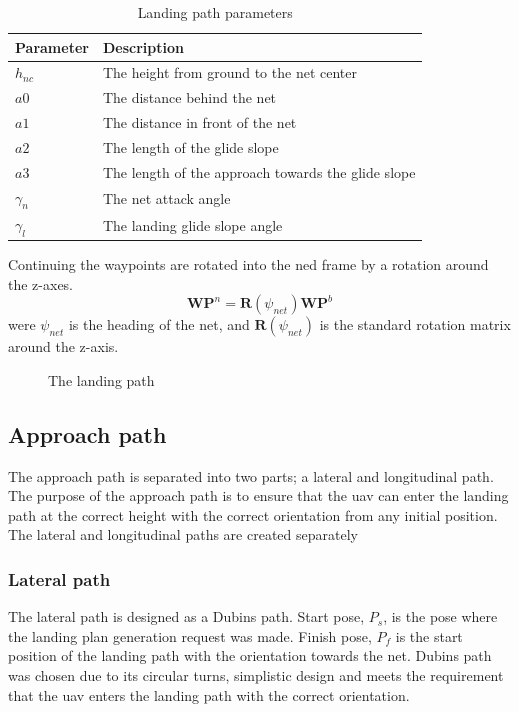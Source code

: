 \begin{table}[H]
\begin{center}
    \begin{tabular}{ | l | l |}
    \hline
    \textbf{Parameter} & \textbf{Description} \\ \hline
    $h_{nc}$ & The height from ground to the net center \\ \hline
    $a0$ & The distance behind the net \\ \hline
    $a1$ & The distance in front of the net \\ \hline
    $a2$ & The length of the glide slope \\ \hline
    $a3$ & The length of the approach towards the glide slope \\ \hline
    $\gamma_n$ & The net attack angle \\ \hline
    $\gamma_l$ & The landing glide slope angle \\ \hline
    \end{tabular}
\end{center}
\caption{Landing path parameters }
\label{Tb:Approach Parameters}
\end{table}
Continuing the waypoints are rotated into the \gls{ned} frame by a rotation around the z-axes.
\begin{equation}
\mathbf{WP}^n = \mathbf{R}(\psi_{net})\mathbf{WP}^b
\end{equation}
were $\psi_{net}$ is the heading of the net, and $\mathbf{R}(\psi_{net})$ is the standard rotation matrix around the z-axis.
\begin{figure}
\def\svgwidth{\textwidth} %

\caption{The landing path}
\label{Fig:LandingPhase}
\end{figure}

\subsection{Approach path}\label{SS:LandingApproach}
The approach path is separated into two parts; a lateral and longitudinal path. The purpose of the approach path is to ensure that the \gls{uav} can enter the landing path at the correct height with the correct orientation from any initial position. The lateral and longitudinal paths are created separately 
\subsubsection{Lateral path}
The lateral path is designed as a Dubins path. Start pose, $P_s$, is the pose where the landing plan generation request was made. Finish pose, $P_f$ is the start position of the landing path with the orientation towards the net. Dubins path was chosen due to its circular turns, simplistic design and meets the requirement that the \gls{uav} enters the landing path with the correct orientation.

